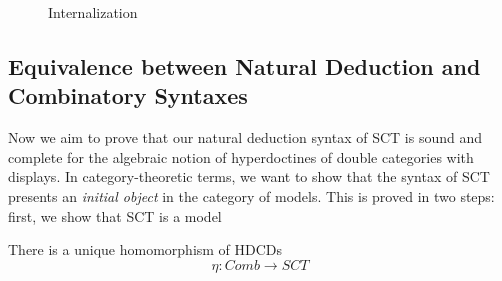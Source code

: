 \begin{figure}
  \caption{Internalization}
\end{figure}

\subsection{Equivalence between Natural Deduction and Combinatory Syntaxes}

Now we aim to prove that our natural deduction syntax of SCT is sound
and complete for the algebraic notion of hyperdoctines of double
categories with displays.
%
In category-theoretic terms, we want to show that the syntax of SCT
presents an \emph{initial object} in the category of models.
%
This is proved in two steps: first, we show that SCT is a model

\begin{corollary}
  There is a unique homomorphism of HDCDs
  \[ \eta : Comb \to SCT \]
\end{corollary}

